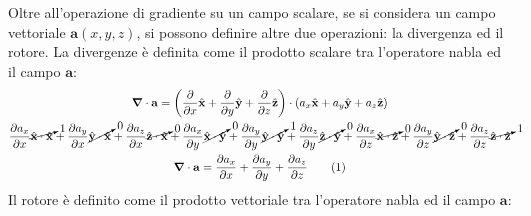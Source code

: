 \documentclass{article}
\newcommand{\vect}[1]{\boldsymbol{\mathbf{#1}}}
\newcommand{\tageq}{\tag{\stepcounter{equation}\theequation}}
\numberwithin{equation}{subsection}
\begin{document}
Oltre all'operazione di gradiente su un campo scalare, se si considera un campo vettoriale $\vect{a}(x,y,z)$, si possono definire altre due operazioni: la divergenza ed il 
rotore. La divergenze è definita come il prodotto scalare tra l'operatore nabla ed il campo $\vect{a}$:
\begin{gather*}
    {\vect\nabla}\cdot\vect{a}=\displaystyle\left(\frac{\partial}{\partial x}\hat{\vect{x}}+\frac{\partial}{\partial y}\hat{\vect{y}}+\frac{\partial}{\partial z}\hat{\vect{z}}\right)\cdot\left(a_x\hat{\vect{x}}+a_y\hat{\vect{y}}+a_z\hat{\vect{z}}\right)\\
    \displaystyle\frac{\partial a_x}{\partial x}\cancelto{1}{\hat{\vect{x}}\cdot\hat{\vect{x}}}+\frac{\partial a_y}{\partial x}\cancelto{0}{\hat{\vect{y}}\cdot\hat{\vect{x}}}+\frac{\partial a_z}{\partial x}\cancelto{0}{\hat{\vect{z}}\cdot\hat{\vect{x}}}+
    \frac{\partial a_x}{\partial y}\cancelto{0}{\hat{\vect{x}}\cdot\hat{\vect{y}}}+\frac{\partial a_y}{\partial y}\cancelto{1}{\hat{\vect{y}}\cdot\hat{\vect{y}}}+\frac{\partial a_z}{\partial y}\cancelto{0}{\hat{\vect{z}}\cdot\hat{\vect{y}}}+
    \frac{\partial a_x}{\partial z}\cancelto{0}{\hat{\vect{x}}\cdot\hat{\vect{z}}}+\frac{\partial a_y}{\partial z}\cancelto{0}{\hat{\vect{y}}\cdot\hat{\vect{z}}}+\frac{\partial a_z}{\partial z}\cancelto{1}{\hat{\vect{z}}\cdot\hat{\vect{z}}}\\
    {\vect\nabla}\cdot\vect{a}=\displaystyle\frac{\partial a_x}{\partial x}+\frac{\partial a_y}{\partial y}+\frac{\partial a_z}{\partial z}\tageq
\end{gather*}
Il rotore è definito come il prodotto vettoriale tra l'operatore nabla ed il campo $\vect{a}$:
\end{document}
